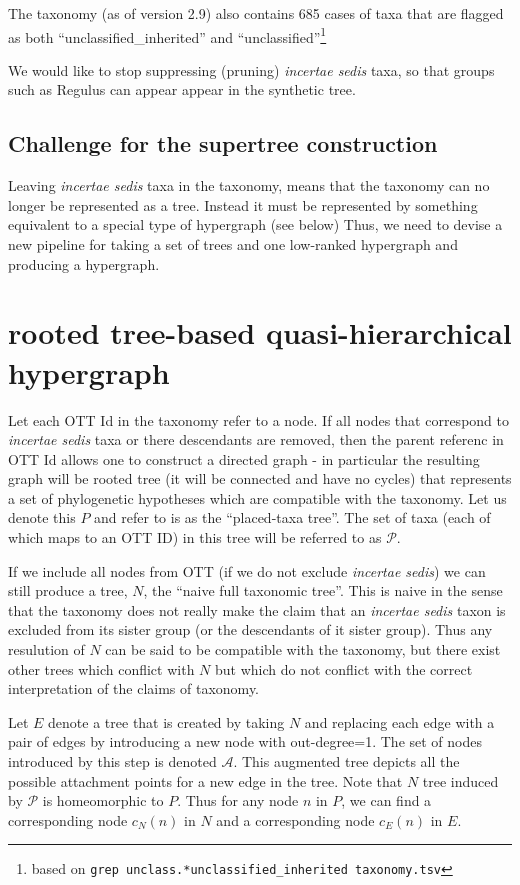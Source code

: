 \documentclass[11pt]{article}
\newcommand{\insed}{{\em incertae sedis}\xspace}
\newcommand{\specialHypergraph}{rooted tree-based quasi-hierarchical hypergraph \xspace}
\newcommand{\placedTaxa}{\ensuremath{\mathcal{P}}\xspace}
\newcommand{\placedTaxoTree}{\ensuremath{P}\xspace}
\newcommand{\placedTaxoTreeName}{placed-taxa tree\xspace}
\newcommand{\naiveFullTree}{\ensuremath{N}\xspace}
\newcommand{\augmentedFullTree}{\ensuremath{E}\xspace}
\newcommand{\naiveFullTreeName}{naive full taxonomic tree\xspace}
\newcommand{\corresponding}[2]{\ensuremath{c_{#2}(#1)}\xspace}
\begin{document}
The taxonomy (as of version 2.9) also contains 685 cases of taxa that are flagged as both
    ``unclassified\_inherited'' and  ``unclassified''\footnote{based on {\tt grep unclass.*unclassified\_inherited taxonomy.tsv}}

We would like to stop suppressing (pruning) \insed taxa, so that groups such as Regulus can appear
    appear in the synthetic tree.

\subsection{Challenge for the supertree construction}
Leaving \insed taxa in the taxonomy, means that the taxonomy can no longer be represented as 
    a tree.
Instead it must be represented by something equivalent to a special type of hypergraph (see below)
Thus, we need to devise a new pipeline for taking a set of trees and one low-ranked hypergraph and
    producing a hypergraph.

\section{\specialHypergraph}
Let each OTT Id in the taxonomy refer to a node.
If all nodes that correspond to \insed taxa or there descendants are removed,
    then the parent referenc in OTT Id allows one to construct 
    a directed graph - in particular the resulting graph will be rooted tree (it will be connected
    and have no cycles) that represents a set of phylogenetic hypotheses  which are compatible
    with the taxonomy.
Let us denote this \placedTaxoTree and refer to is as the ``\placedTaxoTreeName''.
The set of taxa (each of which maps to an OTT ID) in this tree will be referred to as \placedTaxa.

If we include all nodes from OTT (if we do not exclude \insed) we can still produce
    a tree,  \naiveFullTree, the ``\naiveFullTreeName''.
This is naive in the sense that the taxonomy does not really make the claim that an \insed
    taxon is excluded from its sister group (or the descendants of it sister group). 
Thus any resulution of \naiveFullTree can be said to be compatible with the taxonomy, but there
    exist other trees which conflict with \naiveFullTree but which do not conflict with
    the correct interpretation of the claims of taxonomy.

Let \augmentedFullTree denote a tree that is created by taking \naiveFullTree and replacing each
    edge with a pair of edges by introducing a new node with out-degree=1.
The set of nodes introduced by this step is denoted $\mathcal{A}$.
This augmented tree depicts all the possible attachment points for a new edge in the tree.
Note that \naiveFullTree tree induced by \placedTaxa is homeomorphic to \placedTaxoTree.
Thus for any node $n$ in \placedTaxoTree, we can find a corresponding node 
  \corresponding{n}{\naiveFullTree} in \naiveFullTree and a corresponding node
   \corresponding{n}{\augmentedFullTree} in \augmentedFullTree.
\end{document}

